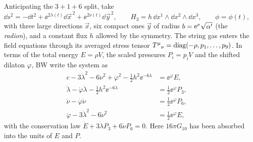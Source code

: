 Anticipating the $3+1+6$ split, take 
\begin{equation}\label{eq:cosmology:ansatz36}
 \dd s^2=-\dd t^2+\ee^{2\lambda(t)}\dd\vec x^{\,2}+\ee^{2\nu(t)}\dd\vec y^{\,2},\qquad
 H_3=h\,\dd x^1\wedge\dd x^2\wedge\dd x^3,\qquad \phi=\phi(t),
\end{equation}
with three large directions $\vec x$, six compact ones $\vec y$ of radius
$b=\mathrm{e}^{\nu}\sqrt{\alpha'}$ (the \emph{radion}), and a constant flux $h$ allowed by
the symmetry. The string gas enters the field equations through its averaged stress tensor
$T^\mu{}_\nu=\operatorname{diag}(-\rho,p_1,\dots,p_9)$. In terms of the total energy $E=\rho V$, the scaled
pressures $P_i=p_iV$ and the shifted dilaton $\varphi$, BW write the system as
\begin{align}
 c-3\dot\lambda^2-6\dot\nu^2+\dot\varphi^2-\tfrac12h^2\ee^{-6\lambda}&=\ee^{\varphi}E,
 \label{eq:cosmology:constraint}\\
 \ddot\lambda-\dot\varphi\dot\lambda-\tfrac12h^2\ee^{-6\lambda}&=\tfrac12\ee^{\varphi}P_3,
 \label{eq:cosmology:lambdaeq}\\
 \ddot\nu-\dot\varphi\dot\nu&=\tfrac12\ee^{\varphi}P_6,
 \label{eq:cosmology:nueq}\\
 \ddot\varphi-3\dot\lambda^2-6\dot\nu^2&=\tfrac12\ee^{\varphi}E,
 \label{eq:cosmology:phieq}
\end{align}
with the conservation law $\dot E+3\dot\lambda P_3+6\dot\nu P_6=0$.
 Here $16\pi G_{10}$ has been absorbed into the
units of $E$ and $P$.

